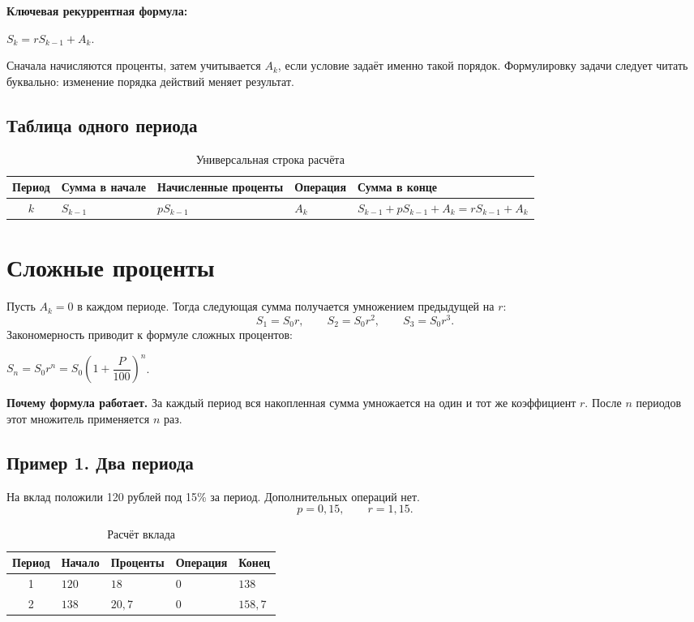 \documentclass[a4paper,12pt]{article}
\newcommand{\term}[1]{\textcolor{darkaccent}{\textbf{#1}}}
\newcommand{\formula}[1]{%
  \begin{center}
    \begin{minipage}{0.92\linewidth}
      \centering\large\color{darkaccent}#1
    \end{minipage}
  \end{center}}
\begin{document}
\term{Ключевая рекуррентная формула:}
\formula{$S_k=rS_{k-1}+A_k$.}

Сначала начисляются проценты, затем учитывается $A_k$, если условие задаёт именно такой порядок. Формулировку задачи следует читать буквально: изменение порядка действий меняет результат.

\subsection{Таблица одного периода}

\begin{table}[ht]
\centering
\caption{Универсальная строка расчёта}
\begin{tabularx}{\linewidth}{@{}cXXXX@{}}
\toprule
Период & Сумма в начале & Начисленные проценты & Операция & Сумма в конце \\
\midrule
$k$ & $S_{k-1}$ & $pS_{k-1}$ & $A_k$ & $S_{k-1}+pS_{k-1}+A_k=rS_{k-1}+A_k$ \\
\bottomrule
\end{tabularx}
\end{table}

\section{Сложные проценты}

Пусть $A_k=0$ в каждом периоде. Тогда следующая сумма получается умножением предыдущей на $r$:
\[
S_1=S_0r,\qquad S_2=S_0r^2,\qquad S_3=S_0r^3.
\]
Закономерность приводит к формуле сложных процентов:
\formula{$\boxed{S_n=S_0r^n=S_0\left(1+\dfrac{P}{100}\right)^n}$.}

\term{Почему формула работает.} За каждый период вся накопленная сумма умножается на один и тот же коэффициент $r$. После $n$ периодов этот множитель применяется $n$ раз.

\subsection{Пример 1. Два периода}

На вклад положили 120 рублей под 15\% за период. Дополнительных операций нет.
\[
p=0{,}15,\qquad r=1{,}15.
\]

\begin{table}[ht]
\centering
\caption{Расчёт вклада}
\begin{tabularx}{\linewidth}{@{}cXXXX@{}}
\toprule
Период & Начало & Проценты & Операция & Конец \\
\midrule
1 & $120$ & $18$ & $0$ & $138$ \\
2 & $138$ & $20{,}7$ & $0$ & $158{,}7$ \\
\bottomrule
\end{tabularx}
\end{table}
\end{document}
